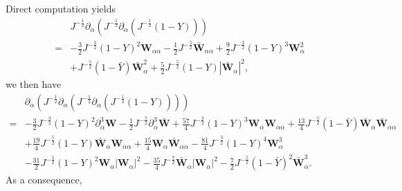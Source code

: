 \documentclass[10pt]{amsart}
\theoremstyle{remark}
\theoremstyle{definition}
\numberwithin{equation}{section}
\newcommand{\p}{\partial}
\newcommand{\al}{\alpha}
\newcommand{\f}{\frac}
\newcommand{\bw}{\mathbf{W}}
\begin{document}
Direct computation yields
\begin{align*}
&J^{-\f12}\p_{\al}\left(J^{-\f12}\p_{\al}\left(J^{-\f12}(1-Y)\right)\right)\\
=&-\f32 J^{-\f32}(1-Y)^2\bw_{\al\al}-\f12 J^{-\f52}
\bar{\bw}_{\al\al}+\f92J^{-\f32}(1-Y)^3\bw_{\al}^2\\
&+J^{-\f52}(1-\bar{Y})\bar{\bw}_{\al}^2
+\f52J^{-\f52}(1-Y)|\bar{\bw}_{\al}|^2,
\end{align*}
we then have
\begin{align*}
&\p_{\al}\left(J^{-\f12}\p_{\al}\left(J^{-\f12}\p_{\al}\left(J^{-\f12}(1-Y)\right)\right)\right)\\
=&-\f32 J^{-\f32}(1-Y)^2\p^3_{\al}\bw-\f12 J^{-\f52}
\p^3_{\al}\bar{\bw}+\f{57}{4}J^{-\f32}(1-Y)^3\bw_{\al}\bw_{\al\al} +\f{13}{4}J^{-\f52}(1-\bar{Y})\bar{\bw}_{\al}\bar{\bw}_{\al\al}\\
&+\f{19}{4}J^{-\f52}(1-Y)\bar{\bw}_{\al}\bw_{\al\al}+\f{15}{4}\bw_\al\bar{\bw}_{\al\al}-\f{81}{4}J^{-\f32}(1-Y)^4\bw^3_{\al}\\
&-\f{31}{2}J^{-\f52}(1-Y)^2\bw_{\al}|\bw_{\al}|^2-\f{35}{4}J^{-\f72}\bar{\bw}_{\al}|\bw_{\al}|^2-\f{7}{2}J^{-\f52}(1-\bar{Y})^2\bar{\bw}^3_{\al}.
\end{align*} 
As a consequence,
\end{document}
